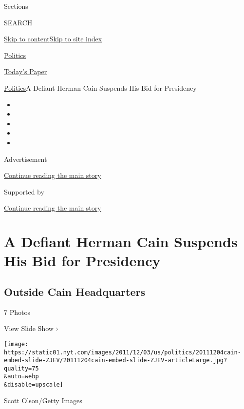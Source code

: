 Sections

SEARCH

\protect\hyperlink{site-content}{Skip to
content}\protect\hyperlink{site-index}{Skip to site index}

\href{https://www.nytimes.com/section/politics}{Politics}

\href{https://myaccount.nytimes.com/auth/login?response_type=cookie\&client_id=vi}{}

\href{https://www.nytimes.com/section/todayspaper}{Today's Paper}

\href{/section/politics}{Politics}\textbar{}A Defiant Herman Cain
Suspends His Bid for Presidency

\begin{itemize}
\item
\item
\item
\item
\item
\end{itemize}

Advertisement

\protect\hyperlink{after-top}{Continue reading the main story}

Supported by

\protect\hyperlink{after-sponsor}{Continue reading the main story}

\hypertarget{a-defiant-herman-cain-suspends-his-bid-for-presidency}{%
\section{A Defiant Herman Cain Suspends His Bid for
Presidency}\label{a-defiant-herman-cain-suspends-his-bid-for-presidency}}

\href{https://www.nytimes.com/slideshow/2011/12/03/us/politics/20111204cain-embed.html}{}

\hypertarget{outside-cain-headquarters}{%
\subsection{Outside Cain Headquarters}\label{outside-cain-headquarters}}

7 Photos

View Slide Show ›

\texttt{[image: https://static01.nyt.com/images/2011/12/03/us/politics/20111204cain-embed-slide-ZJEV/20111204cain-embed-slide-ZJEV-articleLarge.jpg?quality=75\\\&auto=webp\\\&disable=upscale]}

Scott Olson/Getty Images

